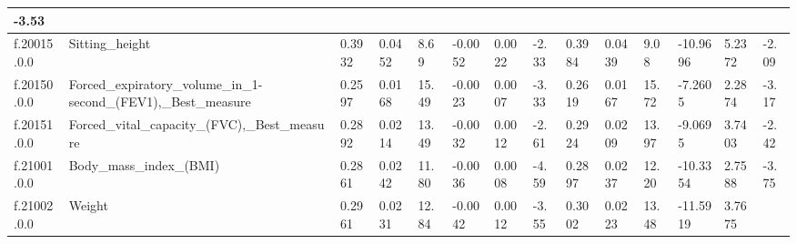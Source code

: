 \begin{longtable}{llllllllllllll}
  \multicolumn{1}{l|}{-3.53} \\ \hline
\multicolumn{1}{|l|}{f.20015.0.0} &
  \multicolumn{1}{l|}{Sitting\_height} &
  \multicolumn{1}{l|}{0.3932} &
  \multicolumn{1}{l|}{0.0452} &
  \multicolumn{1}{l|}{8.69} &
  \multicolumn{1}{l|}{-0.0052} &
  \multicolumn{1}{l|}{0.0022} &
  \multicolumn{1}{l|}{-2.33} &
  \multicolumn{1}{l|}{0.3984} &
  \multicolumn{1}{l|}{0.0439} &
  \multicolumn{1}{l|}{9.08} &
  \multicolumn{1}{l|}{-10.9696} &
  \multicolumn{1}{l|}{5.2372} &
  \multicolumn{1}{l|}{-2.09} \\ \hline
\multicolumn{1}{|l|}{f.20150.0.0} &
  \multicolumn{1}{l|}{Forced\_expiratory\_volume\_in\_1-second\_(FEV1),\_Best\_measure} &
  \multicolumn{1}{l|}{0.2597} &
  \multicolumn{1}{l|}{0.0168} &
  \multicolumn{1}{l|}{15.49} &
  \multicolumn{1}{l|}{-0.0023} &
  \multicolumn{1}{l|}{0.0007} &
  \multicolumn{1}{l|}{-3.33} &
  \multicolumn{1}{l|}{0.2619} &
  \multicolumn{1}{l|}{0.0167} &
  \multicolumn{1}{l|}{15.72} &
  \multicolumn{1}{l|}{-7.2605} &
  \multicolumn{1}{l|}{2.2874} &
  \multicolumn{1}{l|}{-3.17} \\ \hline
\multicolumn{1}{|l|}{f.20151.0.0} &
  \multicolumn{1}{l|}{Forced\_vital\_capacity\_(FVC),\_Best\_measure} &
  \multicolumn{1}{l|}{0.2892} &
  \multicolumn{1}{l|}{0.0214} &
  \multicolumn{1}{l|}{13.49} &
  \multicolumn{1}{l|}{-0.0032} &
  \multicolumn{1}{l|}{0.0012} &
  \multicolumn{1}{l|}{-2.61} &
  \multicolumn{1}{l|}{0.2924} &
  \multicolumn{1}{l|}{0.0209} &
  \multicolumn{1}{l|}{13.97} &
  \multicolumn{1}{l|}{-9.0695} &
  \multicolumn{1}{l|}{3.7403} &
  \multicolumn{1}{l|}{-2.42} \\ \hline
\multicolumn{1}{|l|}{f.21001.0.0} &
  \multicolumn{1}{l|}{Body\_mass\_index\_(BMI)} &
  \multicolumn{1}{l|}{0.2861} &
  \multicolumn{1}{l|}{0.0242} &
  \multicolumn{1}{l|}{11.80} &
  \multicolumn{1}{l|}{-0.0036} &
  \multicolumn{1}{l|}{0.0008} &
  \multicolumn{1}{l|}{-4.59} &
  \multicolumn{1}{l|}{0.2897} &
  \multicolumn{1}{l|}{0.0237} &
  \multicolumn{1}{l|}{12.20} &
  \multicolumn{1}{l|}{-10.3354} &
  \multicolumn{1}{l|}{2.7588} &
  \multicolumn{1}{l|}{-3.75} \\ \hline
\multicolumn{1}{|l|}{f.21002.0.0} &
  \multicolumn{1}{l|}{Weight} &
  \multicolumn{1}{l|}{0.2961} &
  \multicolumn{1}{l|}{0.0231} &
  \multicolumn{1}{l|}{12.84} &
  \multicolumn{1}{l|}{-0.0042} &
  \multicolumn{1}{l|}{0.0012} &
  \multicolumn{1}{l|}{-3.55} &
  \multicolumn{1}{l|}{0.3002} &
  \multicolumn{1}{l|}{0.0223} &
  \multicolumn{1}{l|}{13.48} &
  \multicolumn{1}{l|}{-11.5919} &
  \multicolumn{1}{l|}{3.7675} &

\end{longtable}
